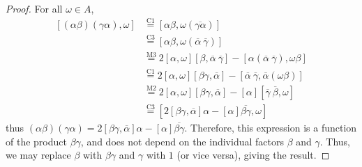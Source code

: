 \documentclass[10pt]{amsart}
\renewcommand{\bar}{\overline}
\newcommand{\norm}[1]{\left[#1\right]}
\begin{document}
\begin{enumerate}
\begin{proof}
For all $\omega \in A$,
\begin{align*}
\norm{(\alpha\beta)(\gamma\alpha),\omega}
&\overset{\text{C}1}{=} \norm{\alpha\beta, \omega(\bar{\gamma\alpha})}
\\
&\overset{\text{C}3}{=} \norm{\alpha\beta, \omega(\bar{\alpha} \ \bar{\gamma})}
\\
&\overset{\text{M}3}{=} 2\norm{\alpha,\omega}\norm{\beta,\bar{\alpha} \ \bar{\gamma}} - \norm{\alpha(\bar{\alpha} \ \bar{\gamma}),\omega\beta}
\\
&\overset{\text{C}1}{=} 2\norm{\alpha,\omega}\norm{\beta\gamma,\bar{\alpha}} - \norm{\bar{\alpha} \ \bar{\gamma}, \bar{\alpha}(\omega \beta)}
\\
&\overset{\text{M}2}{=} 2\norm{\alpha,\omega}\norm{\beta\gamma,\bar{\alpha}} - \norm{\alpha}\norm{\bar{\gamma} \ \bar{\beta}, \omega}
\\
&\overset{\text{C}3}{=}
\norm{2\norm{\beta\gamma,\bar{\alpha}}\alpha - \norm{\alpha}\bar{\beta \gamma} , \omega}
\end{align*}
thus $(\alpha\beta)(\gamma\alpha) = 2\norm{\beta\gamma,\bar{\alpha}}\alpha - \norm{\alpha}\bar{\beta \gamma}$.  Therefore, this expression is a function of the product $\beta \gamma$, and does not depend on the individual factors $\beta$ and $\gamma$.  Thus, we may replace $\beta$ with $\beta\gamma$ and $\gamma$ with $1$ (or vice versa), giving the result.
\end{proof}

\end{enumerate}
\end{document}
